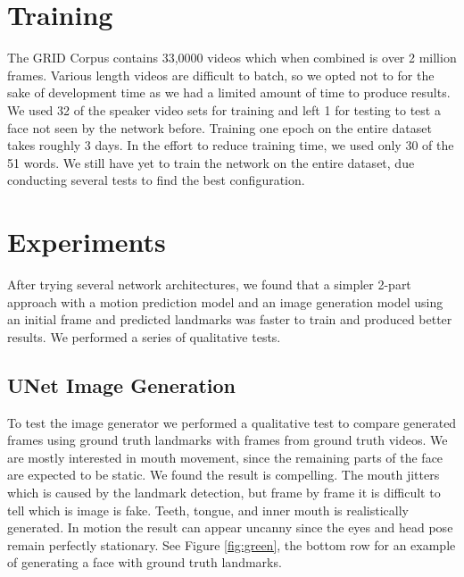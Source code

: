 \documentclass[10pt,twocolumn,letterpaper]{article}
\begin{document}
\section{Training}
 The GRID Corpus contains 33,0000 videos which when combined is over 2 million frames. Various length videos are difficult to batch, so we opted not to for the sake of development time as we had a limited amount of time to produce results. We used 32 of the speaker video sets for training and left 1 for testing to test a face not seen by the network before. Training one epoch on the entire dataset takes roughly 3 days. In the effort to reduce training time, we used only 30 of the 51 words. We still have yet to train the network on the entire dataset, due conducting several tests to find the best configuration.

\section{Experiments}

 After trying several network architectures, we found that a simpler 2-part approach with a motion prediction model and an image generation model using an initial frame and predicted landmarks was faster to train and produced better results. We performed a series of qualitative tests. 
 
\subsection{UNet Image Generation}
 To test the image generator we performed a qualitative test to compare generated frames using ground truth landmarks with frames from ground truth videos. We are mostly interested in mouth movement, since the remaining parts of the face are expected to be static. We found the result is compelling. The mouth jitters which is caused by the landmark detection, but frame by frame it is difficult to tell which is image is fake. Teeth, tongue, and inner mouth is realistically generated. In motion the result can appear uncanny since the eyes and head pose remain perfectly stationary. See Figure \ref*{fig:green}, the bottom row for an example of generating a face with ground truth landmarks.
\end{document}
